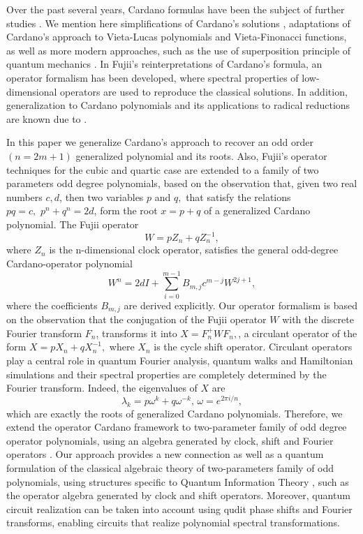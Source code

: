 \documentclass[11pt,reqno]{amsart}
\begin{document}
Over the past several years, Cardano formulas have been the subject of further studies \cite{Pfeifer2025}. We  mention here simplifications of  Cardano's solutions \cite{Liao2023}, adaptations of Cardano's approach to Vieta-Lucas polynomials and Vieta-Finonacci functions\cite{Witula2010}, as well as more modern approaches, such as the use of superposition principle of quantum mechanics \cite{Fujii2013}. In
Fujii's reinterpretations of Cardano's formula, an operator  formalism has been developed, where spectral properties of low-dimensional operators are used to reproduce the classical solutions. In addition, generalization to Cardano polynomials and its applications to radical reductions are known due to \cite{Osler2001}.
\par In this paper we generalize Cardano's approach  to recover an odd order $(n=2m+1)$ generalized  polynomial and its roots.  Also,  Fujii's operator techniques for the cubic and quartic case are extended to a family of two parameters odd degree polynomials, based on the observation that, given two real numbers $c,d$, then two variables $p$ and $q,$ that satisfy the relations $pq=c,\,\, p^n+q^n=2d$, form the root  $x=p+q$ of a generalized Cardano polynomial. The Fujii operator $$W=pZ_n+qZ_n^{-1},$$
where $Z_n$ is the n-dimensional clock operator, satisfies the general odd-degree Cardano-operator polynomial
$$W^n=2dI+\sum\limits_{i=0}^{m-1}B_{m,j}c^{m-j}W^{2j+1},$$
where the coefficients $B_{m,j}$ are derived explicitly. Our operator formalism is based on the observation that the conjugation of the Fujii operator $W$ with the discrete Fourier transform $F_n$, 
transforms it into  $X=F_n^+WF_n, $, a  circulant operator of the form $X=pX_n+qX_n^{-1},$ where $X_n$ is the cycle shift operator. Circulant operators play a central role in quantum Fourier analysis, quantum walks and Hamiltonian simulations and their spectral properties are completely determined by the Fourier transform. Indeed,  the eigenvalues of $X$ are $$\lambda_k=p\omega^k+q\omega^{-k},\, \omega=e^{2\pi i/n},$$
which are exactly the roots of generalized Cardano polynomials. Therefore, we extend the operator Cardano framework to two-parameter family of odd degree operator polynomials, using an algebra generated by clock, shift and Fourier operators \cite{Gosson2006}. Our approach provides a new connection as well as a quantum formulation of the classical algebraic theory of two-parameters family of odd polynomials, using structures specific to Quantum Information Theory \cite{NC10}, such as the operator algebra generated by clock and shift operators. Moreover, quantum circuit realization can be taken into account using qudit phase shifts and Fourier transforms, enabling circuits that realize polynomial spectral transformations.
\end{document}
